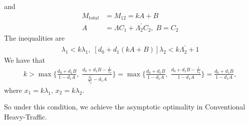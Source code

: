 \documentclass[opre, nonblindrev]{informs3} %
\begin{document}
and 
\begin{align*}
M_{total}&=M_{12}=kA+B\\
A&=\Lambda C_1+\Lambda_2^{\prime}C_2,\;B=C_2
\end{align*}
The inequalities are
\begin{align*}
    [d_0+d_1(kA+B)]\lambda_1<k\lambda_1,\; [d_0+d_1(kA+B)]\lambda_2<k\Lambda_2^{\prime}+1
\end{align*}
We have that 
\begin{align*}
    k>\max\{\frac{d_0+d_1B}{1-d_1A},\;\frac{d_0+d_1B-\frac{1}{\lambda_2}}{\frac{\Lambda_2^{\prime}}{\lambda_2}-d_1A}\}=\max\{\frac{d_0+d_1B}{1-d_1A},\;\frac{d_0+d_1B-\frac{1}{\lambda_2}}{1-d_1A}\}=\frac{d_0+d_1B}{1-d_1A},
\end{align*}
where $x_1=k\lambda_1$, $x_2=k\lambda_2$. 

So under this condition, we achieve the asymptotic optimality in Conventional Heavy-Traffic.
\end{document}
